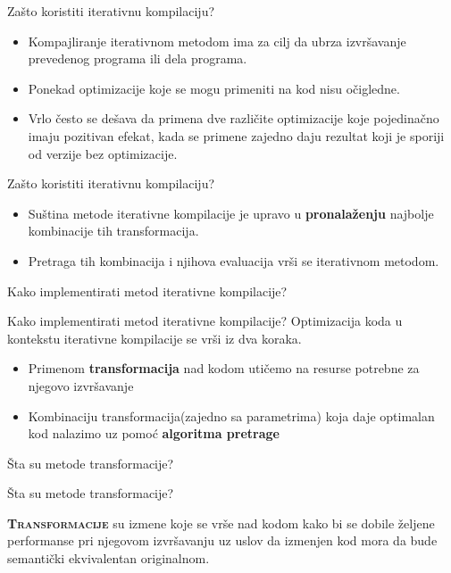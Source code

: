 \documentclass[10pt]{beamer}
\begin{document}
\begin{frame}[fragile]{Zašto koristiti iterativnu kompilaciju?}
\begin{itemize}[<+- | alert@+>]
  \item Kompajliranje iterativnom metodom ima za cilj da ubrza izvršavanje prevedenog programa ili dela programa.

  \item Ponekad optimizacije koje se mogu primeniti na kod nisu očigledne.

  \item Vrlo često se dešava da primena dve različite optimizacije koje pojedinačno imaju pozitivan efekat, kada se primene zajedno daju rezultat koji je sporiji od verzije bez optimizacije.
\end{itemize}
\end{frame}
\begin{frame}[fragile]{Zašto koristiti iterativnu kompilaciju?}
\begin{itemize}[<+- | alert@+>]
  \item Suština metode iterativne kompilacije je upravo u \textbf{pronalaženju} najbolje kombinacije tih transformacija.
  
  
  \item Pretraga tih kombinacija i njihova evaluacija vrši se iterativnom metodom.
\end{itemize}
  
\end{frame}

\begin{frame}[standout]
  Kako implementirati metod iterativne kompilacije?
\end{frame}
\begin{frame}[fragile]{Kako implementirati metod iterativne kompilacije?}
  Optimizacija koda u kontekstu iterativne kompilacije se vrši iz dva koraka.
  \begin{itemize}[<+- | alert@+>]
    \item Primenom \textbf{transformacija} nad kodom utičemo na resurse potrebne za njegovo izvršavanje
    \item Kombinaciju transformacija(zajedno sa parametrima) koja daje optimalan kod nalazimo uz pomoć \textbf{algoritma pretrage}
  \end{itemize}
\end{frame}

\begin{frame}[standout]
  Šta su metode transformacije?
\end{frame}
\begin{frame}[fragile]{Šta su metode transformacije?}

  {\textbf{\textsc{Transformacije}}\xspace}  su izmene koje se vrše nad kodom kako bi se dobile željene performanse pri njegovom izvršavanju uz uslov da izmenjen kod mora da bude semantički ekvivalentan originalnom.
\end{frame}
\end{document}
